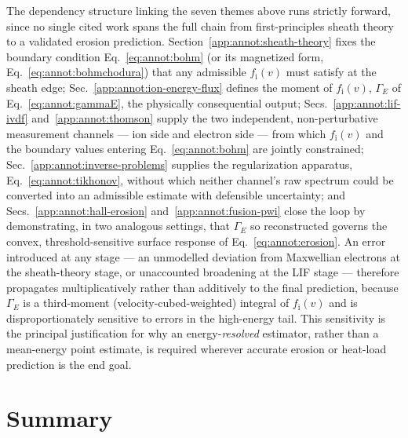 The dependency structure linking the seven themes above runs strictly forward, since no single cited work spans the full chain from first-principles sheath theory to a validated erosion prediction. Section~\ref{app:annot:sheath-theory} fixes the boundary condition Eq.~\eqref{eq:annot:bohm} (or its magnetized form, Eq.~\eqref{eq:annot:bohmchodura}) that any admissible $f_{\mathrm{i}}(v)$ must satisfy at the sheath edge; Sec.~\ref{app:annot:ion-energy-flux} defines the moment of $f_{\mathrm{i}}(v)$, $\Gamma_{E}$ of Eq.~\eqref{eq:annot:gammaE}, the physically consequential output; Secs.~\ref{app:annot:lif-ivdf} and~\ref{app:annot:thomson} supply the two independent, non-perturbative measurement channels --- ion side and electron side --- from which $f_{\mathrm{i}}(v)$ and the boundary values entering Eq.~\eqref{eq:annot:bohm} are jointly constrained; Sec.~\ref{app:annot:inverse-problems} supplies the regularization apparatus, Eq.~\eqref{eq:annot:tikhonov}, without which neither channel's raw spectrum could be converted into an admissible estimate with defensible uncertainty; and Secs.~\ref{app:annot:hall-erosion} and~\ref{app:annot:fusion-pwi} close the loop by demonstrating, in two analogous settings, that $\Gamma_{E}$ so reconstructed governs the convex, threshold-sensitive surface response of Eq.~\eqref{eq:annot:erosion}. An error introduced at any stage --- an unmodelled deviation from Maxwellian electrons at the sheath-theory stage, or unaccounted broadening at the LIF stage --- therefore propagates multiplicatively rather than additively to the final prediction, because $\Gamma_{E}$ is a third-moment (velocity-cubed-weighted) integral of $f_{\mathrm{i}}(v)$ and is disproportionately sensitive to errors in the high-energy tail. This sensitivity is the principal justification for why an energy-\emph{resolved} estimator, rather than a mean-energy point estimate, is required wherever accurate erosion or heat-load prediction is the end goal.

\section{Summary}
\label{app:annot:summary}


